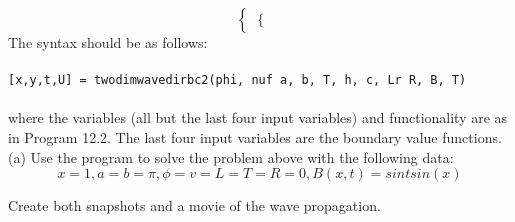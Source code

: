 \documentclass[../main.tex]{subfiles}
\begin{document}
{{\begin{enumerate}
$$\begin{cases}
\begin{cases}
		\end{cases} 
	\end{cases}$$
The syntax should be as follows: 
\\
\\
\texttt{[x,y,t,U] = twodimwavedirbc2(phi, nuf a, b, T, h, c, Lr R, B, T) }
\\
\\
where the variables (all but the last four input variables) and functionality are as in Program 
12.2. The last four input variables are the boundary value functions. 
\\
(a) Use the program to solve the problem above with the following data: 
$$x=1,a=b= \pi, \phi=v=L=T=R=0, B(x,t)=sin t sin(x) $$


Create both snapshots and a movie of the wave propagation.



\end{enumerate}}}
\end{document}
